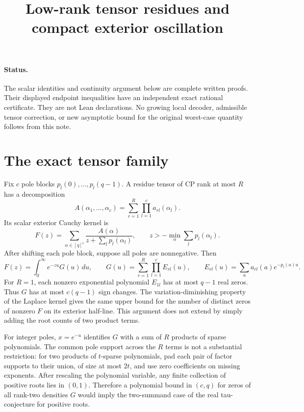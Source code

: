 \documentclass{article}
\begin{document}
\title{Low-rank tensor residues and compact exterior oscillation}
\maketitle

\paragraph{Status.}
The scalar identities and continuity argument below are complete written
proofs.  Their displayed endpoint inequalities have an independent exact
rational certificate.  They are not Lean declarations.  No growing local
decoder, admissible tensor correction, or new asymptotic bound for the
original worst-case quantity follows from this note.

\section{The exact tensor family}

Fix $c$ pole blocks $p_l(0),\ldots,p_l(q-1)$.  A residue tensor of CP rank
at most $R$ has a decomposition
\[
 A(\alpha_1,\ldots,\alpha_c)
 =\sum_{r=1}^R\prod_{l=1}^c a_{rl}(\alpha_l).
\]
Its scalar exterior Cauchy kernel is
\[
 F(z)=\sum_{\alpha\in[q]^c}
 \frac{A(\alpha)}{z+\sum_l p_l(\alpha_l)},
 \qquad z> -\min_\alpha\sum_l p_l(\alpha_l).
\]
After shifting each pole block, suppose all poles are nonnegative.  Then
\[
 F(z)=\int_0^\infty e^{-zu}G(u)\,du,
 \qquad G(u)=\sum_{r=1}^R\prod_{l=1}^c E_{rl}(u),
 \qquad E_{rl}(u)=\sum_a a_{rl}(a)e^{-p_l(a)u}.
\]
For $R=1$, each nonzero exponential polynomial $E_{1l}$ has at most
$q-1$ real zeros.  Thus $G$ has at most $c(q-1)$ sign changes.  The
variation-diminishing property of the Laplace kernel gives the same
upper bound for the number of distinct zeros of nonzero $F$ on its
exterior half-line.  This argument does not extend by simply adding
the root counts of two product terms.

For integer poles, $x=e^{-u}$ identifies $G$ with a sum of $R$ products
of sparse polynomials.  The common pole support across the $R$ terms
is not a substantial restriction: for two products of $t$-sparse
polynomials, pad each pair of factor supports to their union, of size
at most $2t$, and use zero coefficients on missing exponents.  After
rescaling the polynomial variable, any finite collection of positive
roots lies in $(0,1)$.  Therefore a polynomial bound in $(c,q)$ for
zeros of all rank-two densities $G$ would imply the two-summand case
of the real tau-conjecture for positive roots.
\end{document}

